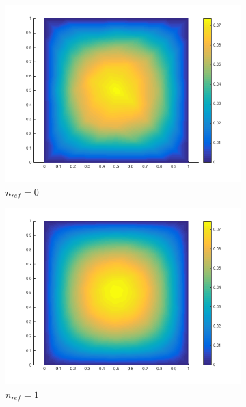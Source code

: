 \documentclass[10pt]{article}
\begin{document}
\begin{figure}[H]
        \centering
        \begin{subfigure}[b]{0.45\textwidth}
                \centering
                \includegraphics[width=\textwidth]{square0.png}
                \caption{\(n_{ref}=0\)}
        \end{subfigure}%
        \begin{subfigure}[b]{0.45\textwidth}
                \centering
                \includegraphics[width=\textwidth]{square1.png}
                \caption{\(n_{ref}=1\)}
        \end{subfigure}\\
        \begin{subfigure}[b]{0.45\textwidth}

\end{subfigure}
\end{figure}
\end{document}
